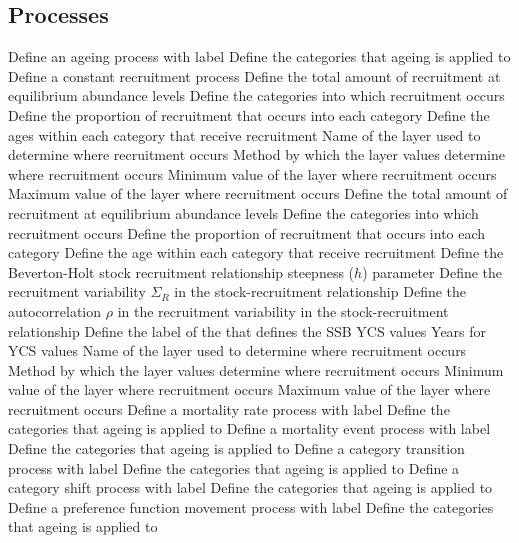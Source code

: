 \subsection*{Processes}
 {Define an ageing process with label}
 {Define the categories that ageing is applied to}
 {Define a constant recruitment process}
 {Define the total amount of recruitment at equilibrium abundance levels}
 {Define the categories into which recruitment occurs}
 {Define the proportion of recruitment that occurs into each category}
 {Define the ages within each category that receive recruitment}
 {Name of the layer used to determine where recruitment occurs}
 {Method by which the layer values determine where recruitment occurs}
 {Minimum value of the layer where recruitment occurs}
 {Maximum value of the layer where recruitment occurs}
 {Define the total amount of recruitment at equilibrium abundance levels}
 {Define the categories into which recruitment occurs}
 {Define the proportion of recruitment that occurs into each category}
 {Define the age within each category that receive recruitment}
 {Define the Beverton-Holt stock recruitment relationship steepness ($h$) parameter}
 {Define the recruitment variability $\Sigma_R$ in the stock-recruitment relationship}
 {Define the autocorrelation $\rho$ in the recruitment variability in the stock-recruitment relationship}
 {Define the label of the  that defines the SSB}
 {YCS values}
 {Years for YCS values}
 {Name of the layer used to determine where recruitment occurs}
 {Method by which the layer values determine where recruitment occurs}
 {Minimum value of the layer where recruitment occurs}
 {Maximum value of the layer where recruitment occurs}
 {Define a mortality rate process with label}
 {Define the categories that ageing is applied to}
 {Define a mortality event process with label}
 {Define the categories that ageing is applied to}
 {Define a category transition process with label}
 {Define the categories that ageing is applied to}
 {Define a category shift process with label}
 {Define the categories that ageing is applied to}
 {Define a preference function movement process with label}
 {Define the categories that ageing is applied to}
